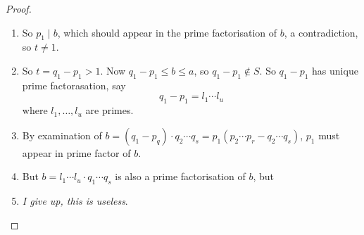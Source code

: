 \documentclass[12pt]{article}
\newenvironment{prf}
{
    \begin{proof}
        \hfill
        \begin{enumerate}[label*=\arabic*.]
                }
                {
                \hfill\qedsymbol
        \end{enumerate}
    \renewcommand{\qedsymbol}{}
    \end{proof}
}
\numberwithin{equation}{dummy}
\theoremstyle{definition}
\begin{document}
\begin{prf}
\item So $p_1\mid b$, which should appear in the prime factorisation of $b$, a contradiction, so $t \ne 1$.
\item So $t = q_1 - p_1 > 1$. Now $q_1 -p_1 \leq b \le a$, so $q_1 - p_1 \not\in S$.
    So $q_1 - p_1$ has unique prime factorasation, say
    $$q_1 - p_1 = l_1 \cdots l_u$$
    where $l_1,\dots,l_u$ are primes.
\item By examination of $b = (q_1 - p_q)\cdot q_2\cdots q_s = p_1(p_2\cdots p_r - q_2\cdots q_s)$, $p_1$ must appear in prime factor of $b$.
\item But $b = l_1\cdots l_u\cdot q_1\cdots q_s$ is also a prime factorisation of $b$, but
\item \emph{I give up, this is useless}.
\end{prf}
\end{document}
